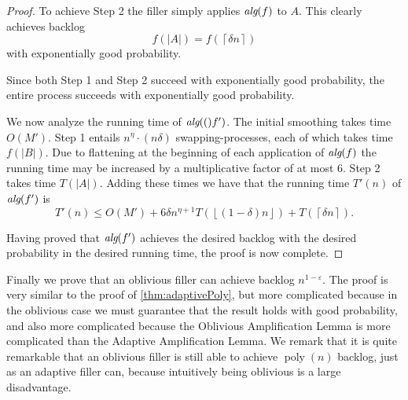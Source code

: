 \documentclass[twocolumn]{article}[10pt]
\DeclareMathOperator{\poly}{\text{poly}}
\newcommand{\alg}[1]{\textit{\text{alg}}({#1})}
\newcommand{\floor}[1]{\left\lfloor #1 \right\rfloor}
\newcommand{\ceil}[1]{\left\lceil #1 \right\rceil}
\begin{document}
\begin{proof}
  To achieve Step 2 the filler simply applies $\alg{f}$ to $A$.
  This clearly achieves backlog 
  $$f(|A|) = f(\ceil{\delta n})$$
  with exponentially good probability.
 
  Since both Step 1 and Step 2 succeed with exponentially good
  probability, the entire process succeeds with exponentially
  good probability.

  We now analyze the running time of $\alg(f')$.
  The initial smoothing takes time $O(M')$. Step 1 entails
  $n^{\eta}\cdot (n\delta)$ swapping-processes, each of which
  takes time $f(|B|)$. Due to flattening at the beginning of each
  application of $\alg{f}$ the running time may be increased by a
  multiplicative factor of at most $6$. Step 2 takes time
  $T(|A|)$. Adding these times we have that the running time
  $T'(n)$ of $\alg{f'}$ is
  $$T'(n) \le O(M') + 6 \delta n^{\eta+1} T(\floor{(1-\delta)n}) + T(\ceil{\delta n}).$$

  Having proved that $\alg{f'}$ achieves the desired backlog
  with the desired probability in the desired running time, the
  proof is now complete.

\end{proof}

Finally we prove that an oblivious filler can achieve backlog
$n^{1-\varepsilon}$. 
The proof is very similar to the proof of
\cref{thm:adaptivePoly}, but more complicated because in the
oblivious case we must guarantee that the result holds with good
probability, and also more complicated because the Oblivious
Amplification Lemma is more complicated than the Adaptive
Amplification Lemma. We remark that it is quite remarkable that
an oblivious filler is still able to achieve $\poly(n)$ backlog, just as
an adaptive filler can, because intuitively being oblivious is a
large disadvantage.
\end{document}
